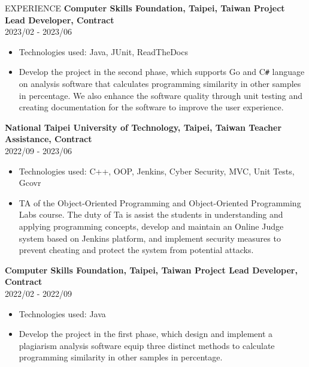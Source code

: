 \documentclass{resume} %
\begin{document}
\begin{rSection}{EXPERIENCE}
{\bf Computer Skills Foundation, Taipei, Taiwan \hfill {Project Lead Developer, Contract}} \\
2023/02 - 2023/06
    \begin{itemize}
        \item {Technologies used: Java, JUnit, ReadTheDocs}
        \item {Develop the project in the second phase, which supports Go and C\verb|#| language on analysis software that calculates programming similarity in other samples in percentage. We also enhance the software quality through unit testing and creating documentation for the software to improve the user experience.}
    \end{itemize}

{\bf National Taipei University of Technology, Taipei, Taiwan \hfill {Teacher Assistance, Contract}} \\
{2022/09 - 2023/06}
    \begin{itemize}
        \item {Technologies used: C++, OOP, Jenkins, Cyber Security, MVC, Unit Tests, Gcovr}
        \item {TA of the Object-Oriented Programming and Object-Oriented Programming Labs course. The duty of Ta is assist the students in understanding and applying programming concepts, develop and maintain an Online Judge system based on Jenkins platform, and implement security measures to prevent cheating and protect the system from potential attacks.}
    \end{itemize}
    
{\bf Computer Skills Foundation, Taipei, Taiwan \hfill {Project Lead Developer, Contract}} \\
2022/02 - 2022/09
    \begin{itemize}
        \item {Technologies used: Java}
        \item {Develop the project in the first phase, which design and implement a plagiarism analysis software equip three distinct methods to calculate programming similarity in other samples in percentage.}
    \end{itemize}
\end{rSection} 

\newpage
\end{document}
